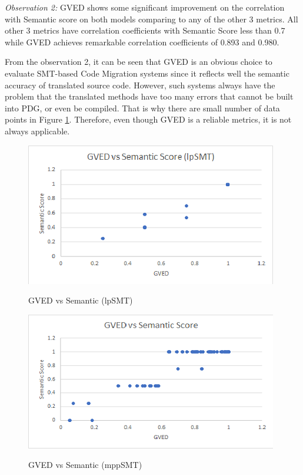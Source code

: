 \emph{Observation 2:} GVED shows some significant improvement on the correlation with Semantic score on both models comparing to any of the other 3 metrics. All other 3 metrics have correlation coefficients with Semantic Score less than 0.7 while GVED achieves remarkable correlation coefficients of 0.893 and 0.980. 

From the observation 2, it can be seen that GVED is an obvious choice to evaluate SMT-based Code Migration systems since it reflects well the semantic accuracy of translated source code.  However, such systems always have the problem that the translated methods have too many errors that cannot be built into PDG, or even be compiled. That is why there are small number of data points in Figure \ref{fig:GVEDlpSMT}. Therefore, even though GVED is a reliable metrics, it is not always applicable.  

\begin{figure}
\caption{GVED vs Semantic (lpSMT)}
\centering
\includegraphics{img/gved_lpSMT.png}
\label{fig:GVEDlpSMT}
\end{figure}

\begin{figure}
\caption{GVED vs Semantic (mppSMT)}
\centering
\includegraphics{img/gved_mppSMT.png}
\label{fig:GVEDmppSMT}
\end{figure}